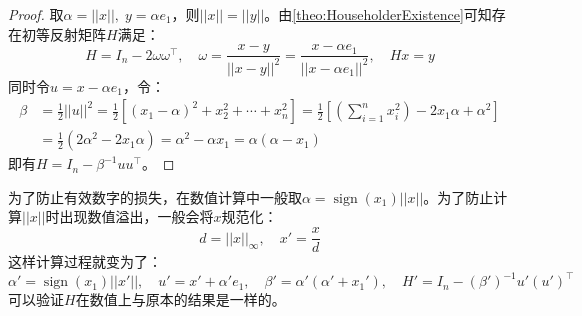 \begin{proof}
	取$\alpha=||x||,\;y=\alpha e_1$，则$||x||=||y||$。由\cref{theo:HouseholderExistence}可知存在初等反射矩阵$H$满足：
	\begin{equation*}
		H=I_n-2\omega\omega^{\top},\quad\omega=\frac{x-y}{||x-y||^2}=\frac{x-\alpha e_1}{||x-\alpha e_1||^2},\quad Hx=y
	\end{equation*}
	同时令$u=x-\alpha e_1$，令：
	\begin{align*}
		\beta&=\frac{1}{2}||u||^2=\frac{1}{2}[(x_1-\alpha)^2+x_2^2+\cdots+x_n^2]=\frac{1}{2}\left[\left(\sum_{i=1}^{n}x_i^2\right)-2x_1\alpha+\alpha^2\right] \\
		&=\frac{1}{2}(2\alpha^2-2x_1\alpha)=\alpha^2-\alpha x_1=\alpha(\alpha-x_1)
	\end{align*}
	即有$H=I_n-\beta^{-1}uu^{\top}$。
\end{proof}
\begin{note}
	为了防止有效数字的损失，在数值计算中一般取$\alpha=\operatorname{sign}(x_1)||x||$。为了防止计算$||x||$时出现数值溢出，一般会将$x$规范化：
	\begin{equation*}
		d=||x||_\infty,\quad x'=\frac{x}{d}
	\end{equation*}
	这样计算过程就变为了：
	\begin{equation*}
		\alpha'=\operatorname{sign}(x_1)||x'||,\quad u'=x'+\alpha' e_1,\quad\beta'=\alpha'(\alpha'+x_1'),\quad H'=I_n-(\beta')^{-1}u'(u')^{\top}
	\end{equation*}
	可以验证$H$在数值上与原本的结果是一样的。
\end{note}

